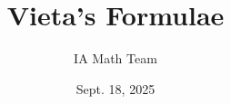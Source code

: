 



\title[Vieta's Formulae]{Vieta's Formulae}

\author[IA Math Team]{IA Math Team}



\vspace{-2cm}\date{Sept. 18, 2025}

    
    

